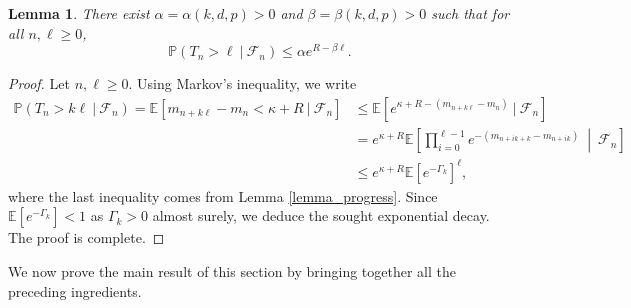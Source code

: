 \documentclass[a4paper, 11pt]{article}
\theoremstyle{plain}
\newtheorem{Lemma}[Theorem]{Lemma}
\theoremstyle{definition}
\newcommand{\E}{\mathbb{E}}
\renewcommand{\P}{\mathbb{P}}
\numberwithin{equation}{section}
\begin{document}
\begin{Lemma}
    \label{lemma_T_n_tail}
    There exist $\alpha=\alpha(k, d, p)>0$ and $\beta=\beta(k, d, p)>0$ such that for all $n,\ell\geq 0$,
        \[\P(T_n>\ell~\vert~\mathcal F_n)\leq\alpha e^{R-\beta \ell}.\]
\end{Lemma}

\begin{proof}
    Let $n,\ell\geq 0$. Using Markov's inequality, we write
        \begin{equation*}
            \begin{split}
                \P(T_n>k\ell~\vert~\mathcal F_n)=\E[m_{n+k\ell}-m_n<\kappa+R~\vert~\mathcal F_n]
                &\leq \E[e^{\kappa+R-(m_{n+k\ell}-m_n)}~\vert~\mathcal F_n]\\
                &=e^{\kappa+R}\E\left[\prod_{i=0}^{\ell-1}e^{-(m_{n+ik+k}-m_{n+ik})}~\middle|~\mathcal F_n\right]\\
                &\leq e^{\kappa+R}\E[e^{-\Gamma_k}]^\ell,
            \end{split}
        \end{equation*}
    where the last inequality comes from Lemma \ref{lemma_progress}. Since $\E[e^{-\Gamma_k}]<1$ as $\Gamma_k>0$ almost surely, we deduce the sought exponential decay. The proof is complete.
\end{proof}


We now prove the main result of this section by bringing together all the preceding ingredients.
\end{document}
